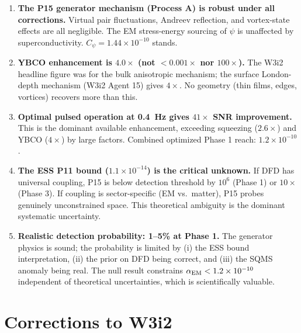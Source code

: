 \documentclass[11pt]{article}
\newcommand{\ee}[1]{\times 10^{#1}}
\begin{document}
\begin{enumerate}
\item \textbf{The P15 generator mechanism (Process A) is robust under all
corrections.} Virtual pair fluctuations, Andreev reflection, and vortex-state
effects are all negligible. The EM stress-energy sourcing of $\psi$ is
unaffected by superconductivity. $C_\psi = 1.44\ee{-10}$ stands.

\item \textbf{YBCO enhancement is $4.0\times$ (not $< 0.001\times$ nor $100\times$).}
The W3i2 headline figure was for the bulk anisotropic mechanism; the surface
London-depth mechanism (W3i2 Agent 15) gives $4\times$. No geometry (thin films,
edges, vortices) recovers more than this.

\item \textbf{Optimal pulsed operation at 0.4~Hz gives $41\times$ SNR improvement.}
This is the dominant available enhancement, exceeding squeezing ($2.6\times$)
and YBCO ($4\times$) by large factors. Combined optimized Phase 1 reach:
$1.2\ee{-10}$.

\item \textbf{The ESS P11 bound ($1.1\ee{-14}$) is the critical unknown.}
If DFD has universal coupling, P15 is below detection threshold by $10^6$
(Phase 1) or $10\times$ (Phase 3). If coupling is sector-specific (EM vs.\
matter), P15 probes genuinely unconstrained space. This theoretical ambiguity
is the dominant systematic uncertainty.

\item \textbf{Realistic detection probability: 1--5\% at Phase 1.}
The generator physics is sound; the probability is limited by (i) the ESS
bound interpretation, (ii) the prior on DFD being correct, and (iii) the
SQMS anomaly being real. The null result constrains $\alpha_{\rm EM} < 1.2\ee{-10}$
independent of theoretical uncertainties, which is scientifically valuable.
\end{enumerate}

\section*{Corrections to W3i2}
\end{document}
